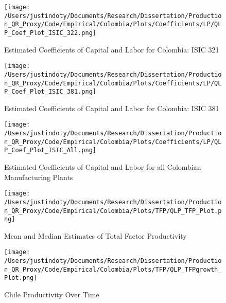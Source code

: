 \documentclass[11pt]{article}
\begin{document}
\begin{figure}[H]
\centering
\caption{Estimated Coefficients of Capital and Labor for Colombia: ISIC 321}
\texttt{[image: /Users/justindoty/Documents/Research/Dissertation/Production\_QR\_Proxy/Code/Empirical/Colombia/Plots/Coefficients/LP/QLP\_Coef\_Plot\_ISIC\_322.png]}
\label{fig:LPCOL321}
\end{figure}

\begin{figure}[H]
\centering
\caption{Estimated Coefficients of Capital and Labor for Colombia: ISIC 381}
\texttt{[image: /Users/justindoty/Documents/Research/Dissertation/Production\_QR\_Proxy/Code/Empirical/Colombia/Plots/Coefficients/LP/QLP\_Coef\_Plot\_ISIC\_381.png]}
\label{fig:LPCOL381}
\end{figure}

\begin{figure}[H]
\centering
\caption{Estimated Coefficients of Capital and Labor for all Colombian Manufacturing Plants}
\texttt{[image: /Users/justindoty/Documents/Research/Dissertation/Production\_QR\_Proxy/Code/Empirical/Colombia/Plots/Coefficients/LP/QLP\_Coef\_Plot\_ISIC\_All.png]}
\label{fig:LPCOLall}
\end{figure}

\begin{figure}[H]
\centering
\caption{Mean and Median Estimates of Total Factor Productivity}
\texttt{[image: /Users/justindoty/Documents/Research/Dissertation/Production\_QR\_Proxy/Code/Empirical/Colombia/Plots/TFP/QLP\_TFP\_Plot.png]}
\label{fig:LPTFPDens}
\end{figure}

\begin{figure}[H]
\centering
\caption{Chile Productivity Over Time}
\texttt{[image: /Users/justindoty/Documents/Research/Dissertation/Production\_QR\_Proxy/Code/Empirical/Colombia/Plots/TFP/QLP\_TFPgrowth\_Plot.png]}
\label{fig:LPCHLpgrowth}
\end{figure}
\end{document}
